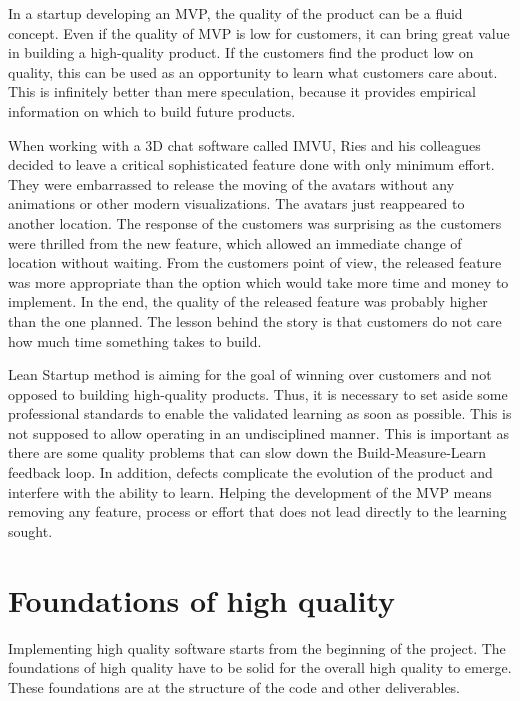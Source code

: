 In a startup developing an MVP, the quality of the product can be a fluid concept. Even if the quality of MVP is low for customers, it can bring great value in building a high-quality product. If the customers find the product low on quality, this can be used as an opportunity to learn what customers care about. This is infinitely better than mere speculation, because it provides empirical information on which to build future products.~\cite{ries2011lean}

When working with a 3D chat software called IMVU, Ries and his colleagues decided to leave a critical sophisticated feature done with only minimum effort. They were embarrassed to release the moving of the avatars without any animations or other modern visualizations. The avatars just reappeared to another location. The response of the customers was surprising as the customers were thrilled from the new feature, which allowed an immediate change of location without waiting. From the customers point of view, the released feature was more appropriate than the option which would take more time and money to implement. In the end, the quality of the released feature was probably higher than the one planned. The lesson behind the story is that customers do not care how much time something takes to build.~\cite{ries2011lean}

Lean Startup method is aiming for the goal of winning over customers and not opposed to building high-quality products. Thus, it is necessary to set aside some professional standards to enable the validated learning as soon as possible. This is not supposed to allow operating in an undisciplined manner. This is important as there are some quality problems that can slow down the Build-Measure-Learn feedback loop. In addition, defects complicate the evolution of the product and interfere with the ability to learn. Helping the development of the MVP means removing any feature, process or effort that does not lead directly to the learning sought.~\cite{ries2011lean}

\section{Foundations of high quality}

Implementing high quality software starts from the beginning of the project. The foundations of high quality have to be solid for the overall high quality to emerge. These foundations are at the structure of the code and other deliverables.

